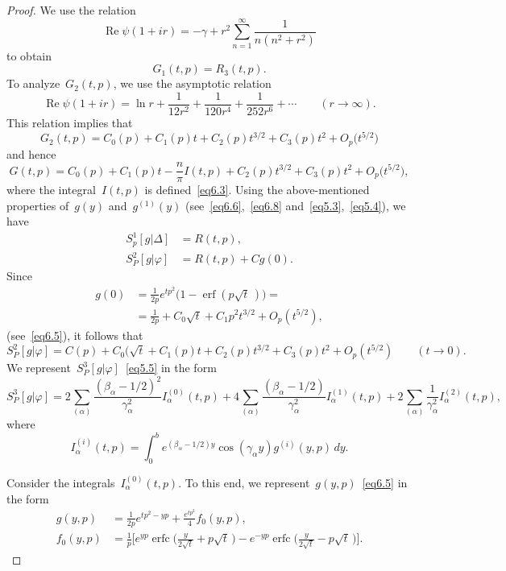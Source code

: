 \documentclass{amsart}
\theoremstyle{plain}
\theoremstyle{definition}
\numberwithin{equation}{section}
\begin{document}
\begin{proof}
We use the relation
$$
\operatorname{Re}\psi(1+ir)=-\gamma+r^2\sum_{n=1}^\infty
\frac{1}{n(n^2+r^2)}
$$
to obtain
$$
G_1(t,p)=R_3(t,p).
$$
To analyze~$G_2(t,p)$, we use the asymptotic relation
$$
\operatorname{Re}\psi(1+ir)=\ln r+\frac{1}{12r^2}+\frac{1}{120r^4}+
\frac{1}{252r^6}+\cdots\qquad (r\to \infty).
$$
This relation implies that
$$
G_{2}(t,p)=C_{0}(p)+C_{1}(p)t+C_{2}(p)t^{3/2}+C_{3}(p)t^{2}+O_{p}\bigl(t^{5/2}\bigr)
$$
and hence
\begin{equation}
\label{eq6.15}
G(t,p)=C_0(p)+C_1(p)t-\frac{n}{\pi}I(t,p)+C_{2}(p)t^{3/2}+C_{3}(p)t^{2}+O_{p}\bigl(t^{5/2}\bigr),
\end{equation}
where the integral~$I(t,p)$ is defined~\eqref{eq6.3}. Using the
above-mentioned properties of~$g(y)$ and~$g^{(1)}(y)$
(see~\eqref{eq6.6},~\eqref{eq6.8}
and~\eqref{eq5.3},~\eqref{eq5.4}), we have
\begin{equation}
\label{eq6.16}
\begin{aligned}
S_p^1[g|\Delta]&=R(t,p),
\\
S_P^2[g|\varphi]&=R(t,p) + Cg(0).
\end{aligned}
\end{equation}
Since
\begin{align}
\nonumber
g(0)&=\frac{1}{2p}e^{tp^2}\bigl(1-\operatorname{erf}(p\sqrt{t}\,)\bigr)=
\\
\label{eq6.17}
&=\frac{1}{2p}+C_0\sqrt{t}+C_1p^2t^{3/2}+O_p(t^{5/2}),
\end{align}
(see~\eqref{eq6.5}), it follows that
\begin{equation}
\label{eq6.18}
S_P^2[g|\varphi]=C(p)+C_0(\sqrt{t}+C_1(p)t+C_2(p)t^{3/2}+C_{3}(p)t^{2}+O_p(t^{5/2})\qquad
(t\to 0).
\end{equation}
We represent~$S_P^3[g|\varphi]$~\eqref{eq5.5} in the form
\begin{equation}
\label{eq6.19}
S_P^3[g|\varphi]=2\sum_{(\alpha)}\frac{(\beta_\alpha-1/2)^2}{\gamma_\alpha^2}
I_\alpha^{(0)}(t,p)+4\sum_{(\alpha)}\frac{(\beta_\alpha-1/2)}{\gamma_\alpha^2}
I_\alpha^{(1)}(t,p)+2\sum_{(\alpha)}\frac{1}{\gamma_\alpha^2}
I_\alpha^{(2)}(t,p),
\end{equation}
where
\begin{equation}
\label{eq6.20}
I_\alpha^{(i)}(t,p)=\int_0^b e^{(\beta_\alpha-1/2)y}
\cos(\gamma_\alpha y)g^{(i)}(y,p)\,dy.
\end{equation}

Consider the integrals~$I_\alpha^{(0)}(t,p)$. To this end, we
represent~$g(y,p)$~\eqref{eq6.5} in the form
\begin{align}
\label{eq6.21}
g(y,p)&=\frac{1}{2p}e^{tp^2-yp}+\frac{e^{tp^2}}{4}f_0(y,p),
\\
\label{eq6.22}
f_0(y,p)&=\frac{1}{p}\biggl[e^{yp}\operatorname{erfc}
\biggl(\frac{y}{2\sqrt{t}}+p\sqrt{t}\,\biggr)-
e^{-yp}\operatorname{erfc}\biggl(\frac{y}{2\sqrt{t}}-
p\sqrt{t}\,\biggr)\biggr].
\end{align}


\end{proof}
\end{document}
